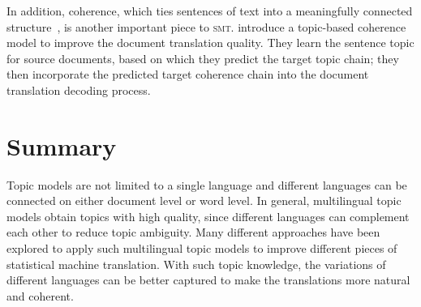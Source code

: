 In addition, coherence, which ties sentences of text into a meaningfully
connected structure~\citep{xiong-13}, is another important piece to
\textsc{smt}. \citet{xiong-13} introduce a topic-based coherence model
to improve the document translation quality. They learn the sentence
topic for source documents, based on which they predict the target
topic chain; they then incorporate the predicted target coherence
chain into the document translation decoding process.

\section{Summary}

Topic models are not limited to a single language and different languages
can be connected on either document level or word level.
In general, multilingual topic models obtain topics with high quality,
since different languages can complement each other to reduce topic
ambiguity. Many different approaches have been explored to apply such
multilingual topic models to improve different pieces of statistical
machine translation. With such topic knowledge, the variations of
different languages can be better captured to make the translations
more natural and coherent.
